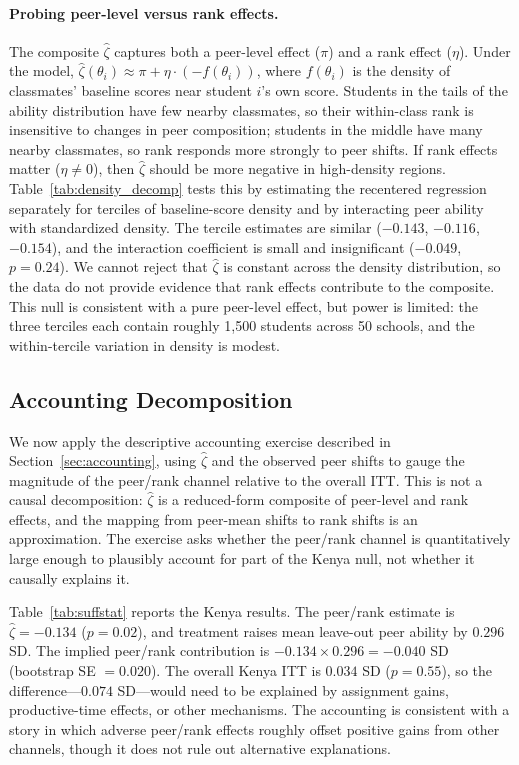 \documentclass[11pt]{article}
\begin{document}
\paragraph{Probing peer-level versus rank effects.} The composite $\hat{\zeta}$ captures both a peer-level effect ($\pi$) and a rank effect ($\eta$). Under the model, $\hat{\zeta}(\theta_i) \approx \pi + \eta \cdot (-f(\theta_i))$, where $f(\theta_i)$ is the density of classmates' baseline scores near student $i$'s own score. Students in the tails of the ability distribution have few nearby classmates, so their within-class rank is insensitive to changes in peer composition; students in the middle have many nearby classmates, so rank responds more strongly to peer shifts. If rank effects matter ($\eta \neq 0$), then $\hat{\zeta}$ should be more negative in high-density regions. Table~\ref{tab:density_decomp} tests this by estimating the recentered regression separately for terciles of baseline-score density and by interacting peer ability with standardized density. The tercile estimates are similar ($-0.143$, $-0.116$, $-0.154$), and the interaction coefficient is small and insignificant ($-0.049$, $p = 0.24$). We cannot reject that $\hat{\zeta}$ is constant across the density distribution, so the data do not provide evidence that rank effects contribute to the composite. This null is consistent with a pure peer-level effect, but power is limited: the three terciles each contain roughly 1,500 students across 50 schools, and the within-tercile variation in density is modest.

\subsection{Accounting Decomposition}

We now apply the descriptive accounting exercise described in Section~\ref{sec:accounting}, using $\hat{\zeta}$ and the observed peer shifts to gauge the magnitude of the peer/rank channel relative to the overall ITT. This is not a causal decomposition: $\hat{\zeta}$ is a reduced-form composite of peer-level and rank effects, and the mapping from peer-mean shifts to rank shifts is an approximation. The exercise asks whether the peer/rank channel is quantitatively large enough to plausibly account for part of the Kenya null, not whether it causally explains it.

Table~\ref{tab:suffstat} reports the Kenya results. The peer/rank estimate is $\hat{\zeta} = -0.134$ ($p = 0.02$), and treatment raises mean leave-out peer ability by $0.296$ SD. The implied peer/rank contribution is $-0.134 \times 0.296 = -0.040$ SD (bootstrap SE $= 0.020$). The overall Kenya ITT is $0.034$ SD ($p = 0.55$), so the difference---$0.074$ SD---would need to be explained by assignment gains, productive-time effects, or other mechanisms. The accounting is consistent with a story in which adverse peer/rank effects roughly offset positive gains from other channels, though it does not rule out alternative explanations.
\end{document}
